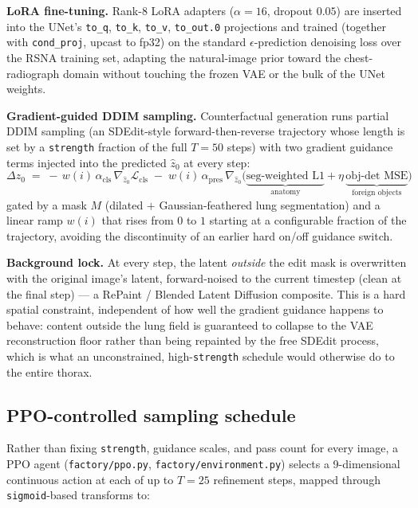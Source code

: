 \documentclass[11pt]{article}
\begin{document}
\textbf{LoRA fine-tuning.} Rank-$8$ LoRA adapters ($\alpha=16$, dropout
$0.05$) are inserted into the UNet's \texttt{to\_q}, \texttt{to\_k},
\texttt{to\_v}, \texttt{to\_out.0} projections and trained (together with
\texttt{cond\_proj}, upcast to fp32) on the standard $\epsilon$-prediction
denoising loss over the RSNA training set, adapting the natural-image
prior toward the chest-radiograph domain without touching the frozen
VAE or the bulk of the UNet weights.

\textbf{Gradient-guided DDIM sampling.} Counterfactual generation runs
partial DDIM sampling (an SDEdit-style forward-then-reverse trajectory
whose length is set by a \texttt{strength} fraction of the full $T=50$
steps) with two gradient guidance terms injected into the predicted
$\hat z_0$ at every step:
\[
  \Delta z_0 \;=\; -\,w(i)\,\alpha_{\text{cls}}\,\nabla_{\hat z_0}
  \mathcal{L}_{\text{cls}} \;-\; w(i)\,\alpha_{\text{pres}}\,
  \nabla_{\hat z_0}\big(\underbrace{\text{seg-weighted L1}}_{\text{anatomy}}
  + \eta\, \underbrace{\text{obj-det MSE}}_{\text{foreign objects}}\big)
\]
gated by a mask $M$ (dilated $+$ Gaussian-feathered lung segmentation)
and a linear ramp $w(i)$ that rises from $0$ to $1$ starting at a
configurable fraction of the trajectory, avoiding the discontinuity of an
earlier hard on/off guidance switch.

\textbf{Background lock.} At every step, the latent \emph{outside} the
edit mask is overwritten with the original image's latent, forward-noised
to the current timestep (clean at the final step) — a RePaint / Blended
Latent Diffusion composite. This is a hard spatial constraint,
independent of how well the gradient guidance happens to behave: content
outside the lung field is guaranteed to collapse to the VAE
reconstruction floor rather than being repainted by the free SDEdit
process, which is what an unconstrained, high-\texttt{strength} schedule
would otherwise do to the entire thorax.

\subsection{PPO-controlled sampling schedule}

Rather than fixing \texttt{strength}, guidance scales, and pass count for
every image, a PPO agent (\texttt{factory/ppo.py},
\texttt{factory/environment.py}) selects a 9-dimensional continuous action
at each of up to $T=25$ refinement steps, mapped through
\texttt{sigmoid}-based transforms to:
\end{document}
